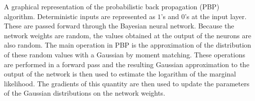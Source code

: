 A graphical representation of the probabilistic back propagation (PBP) algorithm. Deterministic inputs are represented as $1$'s and $0$'s at the input layer. These are passed forward through the Bayesian neural network. Because the network weights are random, the values obtained at the output of the neurons are also random. The main operation in PBP is the approximation of the distribution of these random values with a Gaussian by moment matching. These operations are performed in a forward pass and the resulting Gaussian approximation to the output of the network is then used to estimate the logarithm of the marginal likelihood. The gradients of this quantity are then used to update the parameters of the Gaussian distributions on the network weights.
